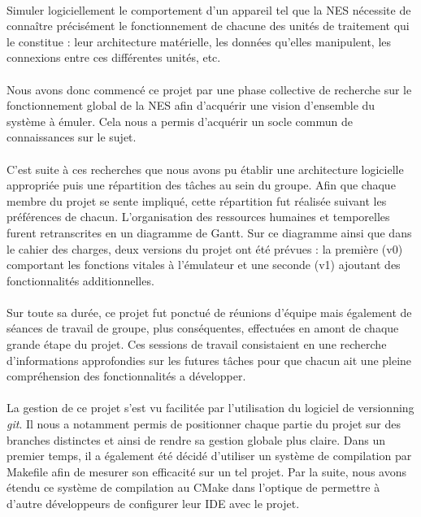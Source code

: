 \paragraph{}

Simuler logiciellement le comportement d'un appareil tel que la NES nécessite de connaître précisément le fonctionnement de chacune des unités de traitement qui le constitue : leur architecture matérielle, les données qu'elles manipulent, les connexions entre ces différentes unités, etc.

\paragraph{}
Nous avons donc commencé ce projet par une phase collective de recherche sur le fonctionnement global de la NES afin d'acquérir une vision d'ensemble du système à émuler. Cela nous a permis d'acquérir un socle commun de connaissances sur le sujet.

\paragraph{}
C'est suite à ces recherches que nous avons pu établir une architecture logicielle appropriée puis une répartition des tâches au sein du groupe. Afin que chaque membre du projet se sente impliqué, cette répartition fut réalisée suivant les préférences de chacun. L'organisation des ressources humaines et temporelles furent retranscrites en un diagramme de Gantt. Sur ce diagramme ainsi que dans le cahier des charges, deux versions du projet ont été prévues : la première (v0) comportant les fonctions vitales à l'émulateur et une seconde (v1) ajoutant des fonctionnalités additionnelles.

\paragraph{}
Sur toute sa durée, ce projet fut ponctué de réunions d'équipe mais également de séances de travail de groupe, plus conséquentes, effectuées en amont de chaque grande étape du projet. Ces sessions de travail consistaient en une recherche d'informations approfondies sur les futures tâches pour que chacun ait une pleine compréhension des fonctionnalités a développer.

\paragraph{}
La gestion de ce projet s'est vu facilitée par l'utilisation du logiciel de versionning \emph{git}. Il nous a notamment permis de positionner chaque partie du projet sur des branches distinctes et ainsi de rendre sa gestion globale plus claire. Dans un premier temps, il a également été décidé d'utiliser un système de compilation par Makefile afin de mesurer son efficacité sur un tel projet. Par la suite, nous avons étendu ce système de compilation au CMake dans l'optique de permettre à d'autre développeurs de configurer leur IDE avec le projet.


